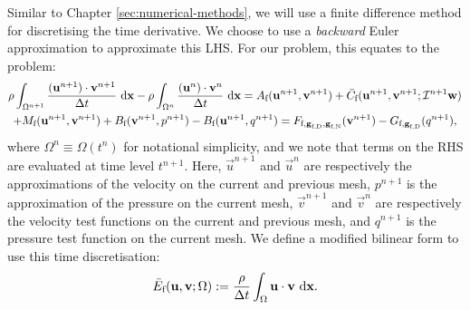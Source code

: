             Similar to Chapter \ref{sec:numerical-methods}, we will use a finite difference method for discretising the time derivative. We choose to use a \textit{backward} Euler approximation to approximate this LHS. For our problem, this equates to the problem:
            \begin{multline*}
                \rho \int_{\Omega^{n+1}} \frac{(\boldsymbol{\mathbf{u}}^{n+1}) \cdot \boldsymbol{\mathbf{v}}^{n+1}}{\Delta t} ~\mathrm{d} \boldsymbol{\mathbf{x}} - \rho \int_{\Omega^n} \frac{(\boldsymbol{\mathbf{u}}^n) \cdot \boldsymbol{\mathbf{v}}^n}{\Delta t} ~\mathrm{d} \boldsymbol{\mathbf{x}} = A_\text{f}(\boldsymbol{\mathbf{u}}^{n+1}, \boldsymbol{\mathbf{v}}^{n+1}) + \bar{C}_\text{f}(\boldsymbol{\mathbf{u}}^{n+1}, \boldsymbol{\mathbf{v}}^{n+1}; \mathcal{I}^{n+1}\boldsymbol{\mathbf{w}}) \\ + M_\text{f}(\boldsymbol{\mathbf{u}}^{n+1}, \boldsymbol{\mathbf{v}}^{n+1}) + B_\text{f}(\boldsymbol{\mathbf{v}}^{n+1}, p^{n+1}) - B_\text{f}(\boldsymbol{\mathbf{u}}^{n+1}, q^{n+1}) = F_{\text{f},\boldsymbol{\mathbf{g}}_\text{f,D},\boldsymbol{\mathbf{g}}_\text{f,N}}(\boldsymbol{\mathbf{v}}^{n+1}) - G_{\text{f},\boldsymbol{\mathbf{g}}_\text{f,D}}(q^{n+1}),
            \end{multline*}
            where $\Omega^n \equiv \Omega(t^n)$ for notational simplicity, and we note that terms on the RHS are evaluated at time level $t^{n+1}$. Here, $\vec{u}^{n+1}$ and $\vec{u}^n$ are respectively the approximations of the velocity on the current and previous mesh, $p^{n+1}$ is the approximation of the pressure on the current mesh, $\vec{v}^{n+1}$ and $\vec{v}^n$ are respectively the velocity test functions on the current and previous mesh, and $q^{n+1}$ is the pressure test function on the current mesh. We define a modified bilinear form to use this time discretisation:
            \begin{equation}
                \bar{E}_\text{f}(\boldsymbol{\mathbf{u}}, \boldsymbol{\mathbf{v}}; \Omega) := \frac{\rho}{\Delta t} \int_{\Omega} \boldsymbol{\mathbf{u}} \cdot \boldsymbol{\mathbf{v}} ~\mathrm{d} \boldsymbol{\mathbf{x}}.
            \end{equation}
            
